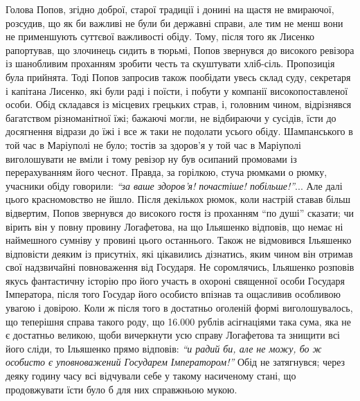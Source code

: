 \documentclass[a4paper,20pt]{report}
\begin{document}
Голова Попов, згідно доброї, старої традиції і донині на щастя не вмираючої,
розсудив, що як би важливі не були би державні справи, але тим не менш вони не применшують
суттєвої важливості обіду. Тому,
після того як Лисенко рапортував, що злочинець сидить в тюрьмі, Попов звернувся
до високого ревізора із шанобливим проханням зробити честь та скуштувати
хліб-сіль. Пропозиція була прийнята. Тоді Попов запросив також пообідати увесь
склад суду, секретаря і капітана Лисенко, які були раді і поїсти, і побути у
компанії високопоставленої особи. Обід складався із місцевих грецьких страв, і,
головним чином, відрізнявся багатством різноманітної їжі; бажаючі могли, не
відбираючи у сусідів, їсти до досягнення відрази до їжі і все ж таки не
подолати усього обіду. Шампанського в той час в Маріуполі не було; тостів за
здоров'я у той час в Маріуполі виголошувати не вміли і тому ревізор ну був
осипаний промовами із перерахуванням його чеснот. Правда, за горілкою, стуча
рюмками о рюмку, учасники обіду говорили: \emph{``за ваше здоров'я! почастіше!
побільше!''}...  Але далі цього красномовство не йшло. Після декількох рюмок,
коли настрій ставав більш відвертим, Попов звернувся до високого гостя із
проханням ``по душі'' сказати; чи вірить він у повну провину Логафетова, на що
Ільяшенко відповів, що немає ні наймешного сумніву у провині цього останнього.
Також не відмовився Ільяшенко відповісти деяким із присутніх, які цікавились
дізнатись, яким чином він отримав свої надзвичайні повноваження від Государя.
Не соромлячись, Ільяшенко розповів якусь фантастичну історію про його участь в охороні
священної особи Государя Імператора, після того Государ його особисто впізнав та
ощасливив особливою увагою і довірою. Коли ж після того в достатньо оголеній формі
виголошувалось, що теперішня справа такого роду, що 16.000 рублів асігнаціями така сума,
яка не є достатньо великою, щоби вичеркнути усю справу Логафетова та знищити всі його сліди,
то Ільяшенко прямо відповів:
\emph{``и радий би, але не можу, бо ж особисто є уповноважений Государем Імператором!''}
Обід не затягнувся; через деяку годину часу всі відчували себе у такому насиченому
стані, що продовжувати їсти було б для них справжньою мукою.
\end{document}

